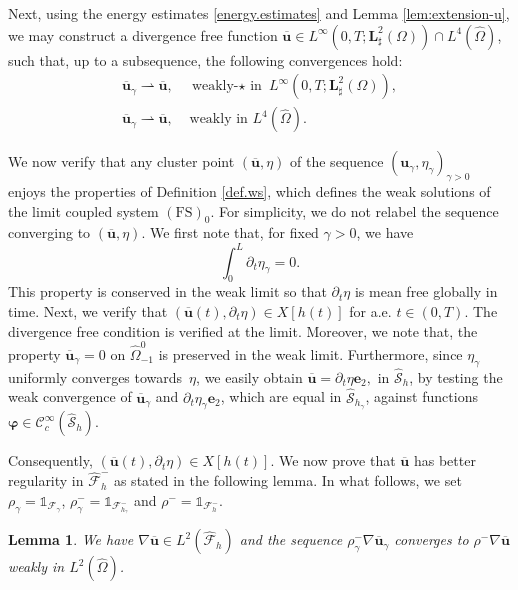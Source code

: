\documentclass[JEP,XML,SOM,Unicode,NoFloatCountersInSection]{cedram}
\let\mathcal\mathscr
\newcommand{\FS}{\mathrm{FS}}
\newtheorem{lemma}[theorem]{Lemma}
\theoremstyle{remark}
\theoremstyle{definition}
\newcommand{\ug}{\boldsymbol{u}}
\newcommand{\BS}[1]{\boldsymbol{#1}}
\let\CM\Omega
\newcommand{\CMT}{\widehat{\Omega}}
\begin{document}
Next, using the energy estimates \eqref{energy.estimates} and Lemma \ref{lem:extension-u}, we may construct a divergence free function $\overline{\ug}\in L^{\infty}(0,T;\BS{L}^{2}_{\sharp}(\CM))\cap L^{4}(\CMT)$, such that, up to a subsequence, the following convergences hold:
\[
\begin{split}
\overline{\ug}_{\gamma}\rightharpoonup\overline{\ug},& \text{ weakly-$\star$ in }L^{\infty}(0,T;\BS{L}^{2}_{\sharp}(\CM)),\\
\overline{\ug}_{\gamma}\rightharpoonup\overline{\ug},&\text{ weakly in } L^{4}(\CMT).
\end{split}
\]

We now verify that any cluster point $(\overline{\ug}, \eta)$ of the sequence $(\ug_{\gamma},\eta_{\gamma})_{\gamma >0}$ enjoys the properties of Definition \ref{def.ws}, which defines the weak solutions of the limit coupled system $(\FS)_0$. For simplicity, we do not relabel the sequence converging to $(\overline{\ug}, \eta)$. We first note that, for fixed $\gamma >0$, we have
\[
\int_0^L \partial_t\eta_{\gamma}=0.
\]
This property is conserved in the weak limit so that $\partial_t\eta$ is mean free globally in time. Next, we verify that $(\overline{\ug}(t),\partial_t \eta) \in X[h(t)]$ for a.e. $t \in (0,T)$. The divergence free condition is verified at the limit. Moreover, we note that,
the property $\overline{\ug}_{\gamma} = 0$ on $\widehat{\Omega}_{-1}^0$ is preserved in the weak limit. Furthermore, since $\eta_\gamma$ uniformly converges towards~$\eta$, we easily obtain $\overline{\ug} =\partial_{t}\eta\BS{e}_2,\text{ in }\widehat{\mathcal{S}}_{h}$, by testing the weak convergence of $ \overline{\ug}_{\gamma}$ and $ \partial_{t}\eta_\gamma\BS{e}_2$, which are equal in $\widehat{\mathcal S}_{h_\gamma}$, against
functions $\BS{\varphi} \in \mathcal C^{\infty}_c(\widehat{\mathcal S}_h)$.

Consequently, $(\overline{\ug}(t),\partial_t \eta) \in X[h(t)]$. We now prove that $\overline{\ug}$ has better regularity in $\widehat{\mathcal F}^-_{h}$ as stated in the following lemma. In what follows, we set $\rho_{\gamma}=\mathds{1}_{\mathcal{F}_{\gamma}}$, $\rho_{\gamma}^{-}=\mathds{1}_{\mathcal{F}_{h_{\gamma}}^{-}}$ and $\rho^{-}=\mathds{1}_{\mathcal{F}_{h}^{-}}$.

\begin{lemma}\label{lemma.gradient}
We have $\nabla \overline{\ug} \in L^2(\widehat{\mathcal F}_h)$ and the sequence $\rho_\gamma^-\nabla \overline{\ug}_{\gamma}$ converges to $\rho^-\nabla \overline{\ug}$ weakly in $L^{2}(\CMT)$.
\end{lemma}
\end{document}
